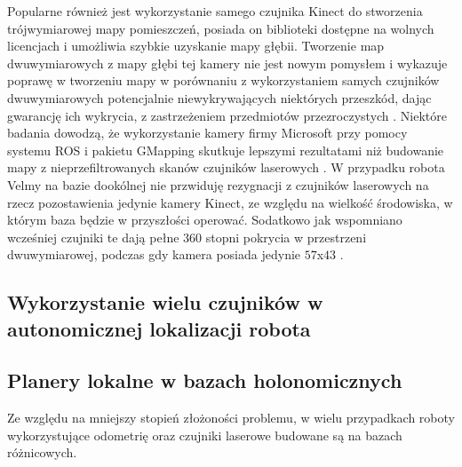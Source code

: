 	Popularne również jest wykorzystanie samego czujnika Kinect do stworzenia trójwymiarowej mapy pomieszczeń, posiada on biblioteki dostępne na wolnych licencjach i umożliwia szybkie uzyskanie mapy głębii.
	Tworzenie map dwuwymiarowych z mapy głębi tej kamery nie jest nowym pomysłem i wykazuje poprawę w tworzeniu mapy w porównaniu z wykorzystaniem samych czujników dwuwymiarowych potencjalnie niewykrywających niektórych przeszkód, dając gwarancję ich wykrycia, z zastrzeżeniem przedmiotów przezroczystych \cite{kamarudin2013method}.
	Niektóre badania dowodzą, że wykorzystanie kamery firmy Microsoft przy pomocy systemu ROS i pakietu GMapping skutkuje lepszymi rezultatami niż budowanie mapy z nieprzefiltrowanych skanów czujników laserowych \cite{omara2015indoor}.
	W przypadku robota Velmy na bazie dookólnej nie przwiduję rezygnacji z czujników laserowych na rzecz pozostawienia jedynie kamery Kinect, ze względu na wielkość środowiska, w którym baza będzie w przyszłości operować.
	Sodatkowo jak wspomniano wcześniej czujniki te dają pełne $360$ stopni pokrycia w przestrzeni dwuwymiarowej, podczas gdy kamera posiada jedynie $57$x$43$ \cite{kinect_fov}. 
	
\subsection{Wykorzystanie wielu czujników w autonomicznej lokalizacji robota}
	
\subsection{Planery lokalne w bazach holonomicznych}
	Ze względu na mniejszy stopień złożoności problemu, w wielu przypadkach roboty wykorzystujące odometrię oraz czujniki laserowe budowane są na bazach różnicowych. 



